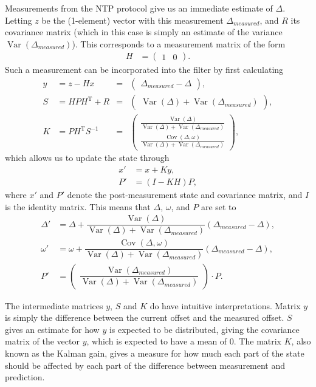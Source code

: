 \documentclass{article}
\DeclareMathOperator{\Var}{Var}
\DeclareMathOperator{\Cov}{Cov}
\begin{document}
Measurements from the NTP protocol give us an immediate estimate of $\Delta$. Letting $z$ be the (1-element) vector with this measurement $\Delta_{measured}$,
and $R$ its covariance matrix (which in this case is simply an estimate of the variance $\Var(\Delta_{measured})$).
This corresponds to a measurement matrix of the form
\begin{align}
H &= \begin{pmatrix}
1 & 0
\end{pmatrix}.
\end{align}
Such a measurement can be incorporated into the filter by first calculating
\begin{align}
y &= z - Hx &=& \begin{pmatrix} \Delta_{measured}-\Delta \end{pmatrix},\\
S &= H P H^\mathrm{T} + R &=& \begin{pmatrix} \Var(\Delta) + \Var(\Delta_{measured}) \end{pmatrix},\\
K &= P H^\mathrm{T} S^{-1} &=& \begin{pmatrix}
\frac{\Var(\Delta)}{\Var(\Delta) + \Var(\Delta_{measured})}\\
\frac{\Cov(\Delta,\omega)}{\Var(\Delta) + \Var(\Delta_{measured})}
\end{pmatrix},
\end{align}
which allows us to update the state through
\begin{align}
x' &= x + Ky,\\
P' &= (I - K H)P,
\end{align}
where $x'$ and $P'$ denote the post-measurement state and covariance matrix, and $I$ is the identity matrix.
This means that $\Delta$, $\omega$, and $P$ are set to
\begin{align}
\Delta' &= \Delta + \dfrac{\Var(\Delta)}{\Var(\Delta) + \Var(\Delta_{measured})} (\Delta_{measured} - \Delta),\\
\omega' &= \omega + \dfrac{\Cov(\Delta, \omega)}{\Var(\Delta) + \Var(\Delta_{measured})} (\Delta_{measured} - \Delta),\\
P' &= \begin{pmatrix}\dfrac{\Var(\Delta_{measured})}{\Var(\Delta) + \Var(\Delta_{measured})}\end{pmatrix} \cdot P.
\end{align}

The intermediate matrices $y$, $S$ and $K$ do have intuitive interpretations. Matrix $y$ is simply the difference between the current offset and the measured offset. $S$ gives an estimate for how $y$ is expected to be distributed, giving the covariance matrix of the vector $y$, which is expected to have a mean of $0$. The matrix $K$, also known as the Kalman gain, gives a measure for how much each part of the state should be affected by each part of the difference between measurement and prediction.
\end{document}
